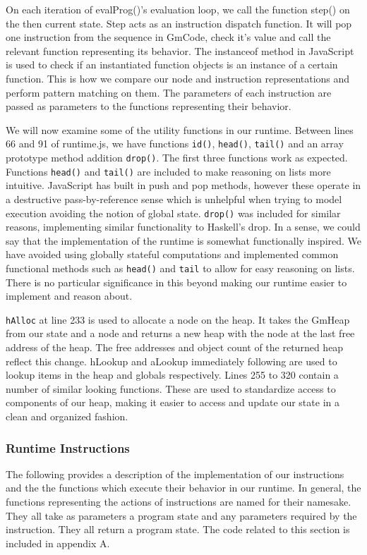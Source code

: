 On each iteration of evalProg()'s evaluation loop, we
call the function step() on the then
current state. Step acts as an instruction dispatch function.
It will pop one instruction from the sequence
in GmCode, check it's value and call the relevant function 
representing its behavior. The instanceof method in JavaScript
is used to check if an instantiated function objects is an
instance of a certain function. This is how we compare our
node and instruction representations and perform pattern 
matching on them. The parameters of each instruction are 
passed as parameters to the functions representing their
behavior. 

We will now examine some of the utility functions in our
runtime. Between lines 66 and 91 of runtime.js, we have
functions \verb!id()!, \verb!head()!, \verb!tail()! and an array prototype
method addition \verb!drop()!. The first three functions work
as expected. Functions \verb!head()! and \verb!tail()! are included to
make reasoning on lists more intuitive. JavaScript has
built in push and pop methods, however these operate in
a destructive pass-by-reference sense which is unhelpful
when trying to model execution avoiding the notion of
global state. \verb!drop()! was included for similar reasons, 
implementing similar functionality to Haskell's drop.
In a sense, we could say that the implementation of the
runtime is somewhat functionally inspired. We have avoided
using globally stateful computations and implemented
common functional methods such as \verb!head()! and 
\verb!tail! to allow for easy reasoning on lists. There is
no particular significance in this beyond making our
runtime easier to implement and reason about.

\verb!hAlloc! at line 233 is used to allocate a node on the
heap. It takes the GmHeap from our state and a node
and returns a new heap with the node at the last free
address of the heap. The free addresses and object
count of the returned heap reflect this change. 
hLookup and aLookup immediately following are used 
to lookup items in the heap and globals respectively. 
Lines 255 to 320 contain a number of similar looking 
functions. These are used to standardize access to 
components of our heap, making it easier to access and
update our state in a clean and organized fashion.

\subsubsection{Runtime Instructions}
The following provides a description of the implementation
of our instructions and the the functions which execute their
behavior in our runtime. In general, the functions representing
the actions of instructions are named for their namesake. They
all take as parameters a program state and any parameters
required by the instruction. They all return a program state.
The code related to this section is included in appendix A.

